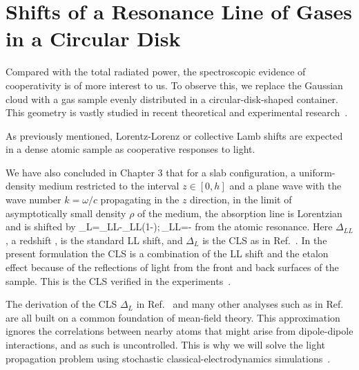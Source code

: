  

\section{Shifts of a Resonance Line of Gases in a Circular Disk}

Compared with the total radiated power, the spectroscopic evidence of cooperativity is of more interest to us. To observe this, we replace the Gaussian cloud with a gas sample evenly distributed in a circular-disk-shaped container. This geometry is vastly studied in recent theoretical and experimental research~\cite{PhysRevLett.108.173601}.

As previously mentioned, Lorentz-Lorenz or collective Lamb shifts are expected in a dense atomic sample as cooperative responses to light. 

We have also concluded in Chapter 3 that for a slab configuration, a uniform-density medium restricted to the interval $z\in [0,h]$ and a plane wave with the wave number $k=\omega/c$ propagating in the $z$ direction, in the limit of asymptotically small density $\rho$ of the medium, the absorption line is Lorentzian and is shifted by
\bea
\Delta_L=\Delta_{LL}-\Delta_{LL}\left(1-\right);\,\quad\Delta_{LL}=-
\label{LL_CLS}
\eea
from the atomic resonance. Here $\Delta_{LL}$, a redshift , is the standard LL shift, and $\Delta_L$ is the CLS as in Ref.~\cite{FRIEDBERG1973101}. In the present formulation the CLS is a combination of the LL shift and the etalon effect because of the reflections of light from the front and back surfaces of the sample. This is the CLS verified in the experiments~\cite{PhysRevLett.108.173601}.

The derivation of the CLS $\Delta_L$ in Ref.~\cite{FRIEDBERG1973101} and many other analyses such as in Ref.~\cite{PhysRevA.81.053821} are all built on a common foundation of mean-field theory. This approximation ignores the correlations between nearby atoms that might arise from dipole-dipole interactions, and as such is uncontrolled. This is why we will solve the light propagation problem using stochastic classical-electrodynamics simulations~\cite{PhysRevA.59.649,PhysRevE.69.026605,PhysRevLett.101.103602,1367-2630-14-5-055001,PhysRevA.86.031602,PhysRevB.86.085116,PhysRevB.86.205128,PhysRevA.88.033844}.

